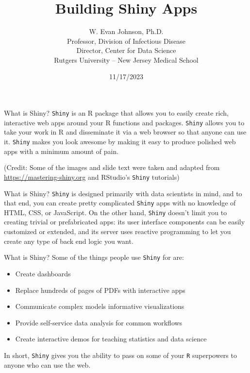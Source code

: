 \documentclass[
  ignorenonframetext,
]{beamer}
\title{Building Shiny Apps}
\author{W. Evan Johnson, Ph.D.\\
Professor, Division of Infectious Disease\\
Director, Center for Data Science\\
Rutgers University -- New Jersey Medical School}
\date{11/17/2023}
\providecommand{\tightlist}{%
  \setlength{\itemsep}{0pt}\setlength{\parskip}{0pt}}
\begin{document}
\frame{\titlepage}

\begin{frame}[fragile]{What is Shiny?}
\label{what-is-shiny}
\texttt{Shiny} is an R package that allows you to easily create rich,
interactive web apps around your R functions and packages.
\texttt{Shiny} allows you to take your work in R and disseminate it via
a web browser so that anyone can use it. \texttt{Shiny} makes you look
awesome by making it easy to produce polished web apps with a minimum
amount of pain.

(Credit: Some of the images and slide text were taken and adapted from
\url{https://mastering-shiny.org} and RStudio's \texttt{Shiny}
tutorials)
\end{frame}

\begin{frame}[fragile]{What is Shiny?}
\label{what-is-shiny-1}
\texttt{Shiny} is designed primarily with data scientists in mind, and
to that end, you can create pretty complicated \texttt{Shiny} apps with
no knowledge of HTML, CSS, or JavaScript. On the other hand,
\texttt{Shiny} doesn't limit you to creating trivial or prefabricated
apps: its user interface components can be easily customized or
extended, and its server uses reactive programming to let you create any
type of back end logic you want.
\end{frame}

\begin{frame}[fragile]{What is Shiny?}
\label{what-is-shiny-2}
Some of the things people use \texttt{Shiny} for are:

\begin{itemize}
\tightlist
\item
  Create dashboards
\item
  Replace hundreds of pages of PDFs with interactive apps
\item
  Communicate complex models informative visualizations
\item
  Provide self-service data analysis for common workflows
\item
  Create interactive demos for teaching statistics and data science
\end{itemize}

In short, \texttt{Shiny} gives you the ability to pass on some of your
\texttt{R} superpowers to anyone who can use the web.
\end{frame}
\end{document}
